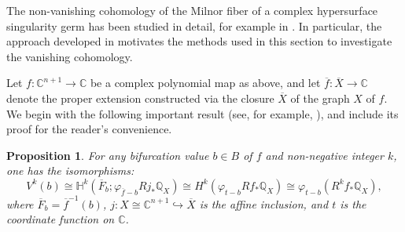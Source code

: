 \documentclass[12pt,leqno,twoside]{amsart}
\newtheorem{proposition}[theorem]{Proposition}
\theoremstyle{remark}
\theoremstyle{remark}
\theoremstyle{definition}
\theoremstyle{remark}
\theoremstyle{remark}
\theoremstyle{remark}
\numberwithin{equation}{section}  %
\newcommand{\C}{\mathbb{C}}
\newcommand{\bC}{\mathbb{C}}
\newcommand{\bH}{\mathbb{H}}
\newcommand{\bQ}{\mathbb{Q}}
\newcommand{\oX}{\overline{X}}
\begin{document}
The non-vanishing cohomology of the Milnor fiber of a complex hypersurface singularity germ has been studied in detail, for example in \cite{MPT2}. In particular, the approach developed in \cite{MPT2} motivates the methods used in this section to investigate the vanishing cohomology.


\smallskip

Let $f\colon \bC^{n+1}\rightarrow \mathbb{C}$ be a complex polynomial map as above, and let $\overline{f}\colon \overline{X} \to \bC$ denote the proper extension constructed via the closure $\oX$ of the graph $X$ of $f$. 
We begin with the following important result (see, for example, \cite[Prop.2.2]{Bre}), and include its proof for the reader’s convenience.
\begin{proposition}\label{p21}
For any bifurcation value $b\in B$ of $f$ and non-negative integer $k$, one has the isomorphisms:
\begin{equation}\label{vanb}
V^k(b)\cong \bH^k(\overline{F}_b; \varphi_{\overline{f}-b}Rj_*\bQ_X) \cong H^k(\varphi_{t-b}Rf_*\bQ_X) \cong \varphi_{t-b}(R^kf_*\bQ_X),
\end{equation}
where $\overline{F}_b=\overline{f}^{-1}(b)$, $j\colon X\cong \C^{n+1}\hookrightarrow \overline{X}$ is the affine inclusion, and $t$ is the coordinate function on $\bC$.
\end{proposition}
\end{document}
